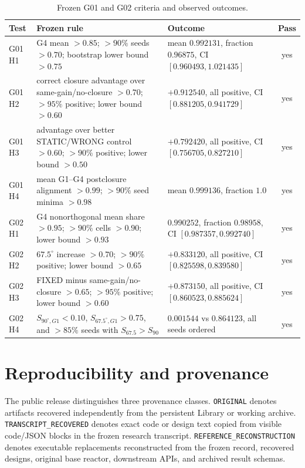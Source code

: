 \documentclass[11pt]{article}
\begin{document}
\begin{table}[H]
\caption{Frozen G01 and G02 criteria and observed outcomes.}
\begin{tabular}{p{}p{}p{}c}
Test & Frozen rule & Outcome & Pass\\
\hline
G01 H1 & G4 mean $>0.85$; $>90\%$ seeds $>0.70$; bootstrap lower bound $>0.75$ & mean $0.992131$, fraction $0.96875$, CI $[0.960493,1.021435]$ & yes\\
G01 H2 & correct closure advantage over same-gain/no-closure $>0.70$; $>95\%$ positive; lower bound $>0.60$ & $+0.912540$, all positive, CI $[0.881205,0.941729]$ & yes\\
G01 H3 & advantage over better STATIC/WRONG control $>0.60$; $>90\%$ positive; lower bound $>0.50$ & $+0.792420$, all positive, CI $[0.756705,0.827210]$ & yes\\
G01 H4 & mean G1--G4 postclosure alignment $>0.99$; $>90\%$ seed minima $>0.98$ & mean $0.999136$, fraction $1.0$ & yes\\
G02 H1 & G4 nonorthogonal mean share $>0.95$; $>90\%$ cells $>0.90$; lower bound $>0.93$ & $0.990252$, fraction $0.98958$, CI $[0.987357,0.992740]$ & yes\\
G02 H2 & $67.5^\circ$ increase $>0.70$; $>90\%$ positive; lower bound $>0.65$ & $+0.833120$, all positive, CI $[0.825598,0.839580]$ & yes\\
G02 H3 & FIXED minus same-gain/no-closure $>0.65$; $>95\%$ positive; lower bound $>0.60$ & $+0.873150$, all positive, CI $[0.860523,0.885624]$ & yes\\
G02 H4 & $S_{90^\circ,G1}<0.10$, $S_{67.5^\circ,G1}>0.75$, and $>85\%$ seeds with $S_{67.5}>S_{90}$ & $0.001544$ vs $0.864123$, all seeds ordered & yes\\
\end{tabular}
\end{table}

\section{Reproducibility and provenance}

The public release distinguishes three provenance classes. \texttt{ORIGINAL} denotes artifacts recovered independently from the persistent Library or working archive. \texttt{TRANSCRIPT\_RECOVERED} denotes exact code or design text copied from visible code/JSON blocks in the frozen research transcript. \texttt{REFERENCE\_RECONSTRUCTION} denotes executable replacements reconstructed from the frozen record, recovered designs, original base reactor, downstream APIs, and archived result schemas.
\end{document}
